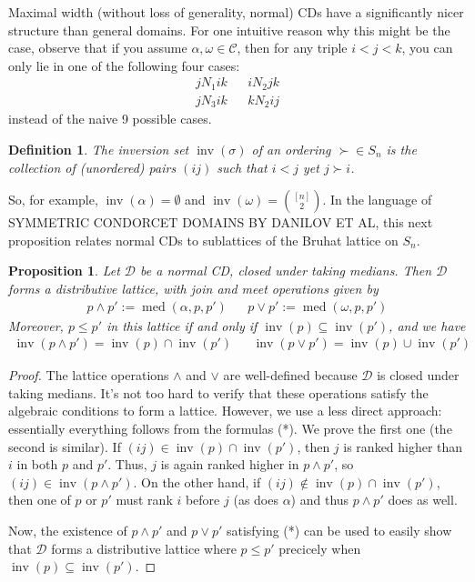 \documentclass[12pt]{article}
\newtheorem{definition}[theorem]{Definition}
\newtheorem{proposition}[theorem]{Proposition}
\newcommand{\C}{\mathcal{C}}
\newcommand{\D}{\mathcal{D}}
\DeclareMathOperator*{\inv}{inv}
\DeclareMathOperator*{\med}{med}
\newcommand{\1}[1]{\mathds{1}[{#1}]}
\begin{document}
  Maximal width (without loss of generality, normal) CDs have a significantly
  nicer structure than general domains. For one intuitive reason why this might
  be the case, observe that if you assume $\alpha,\omega\in\C$, then
  for any triple $i<j<k$, you can only lie in one of the following four cases:
  \begin{align*}
    j N_1 ik && i N_2 jk \\
    j N_3 ik && k N_2 ij
  \end{align*}
  instead of the naive 9 possible cases.

  \begin{definition}
    The inversion set $\inv(\sigma)$ of an ordering $\succ\in S_n$ is
    the collection of (unordered) pairs $(ij)$ such that $i<j$ yet
    $j \succ i$.
  \end{definition}

  So, for example, $\inv(\alpha)=\emptyset$ and $\inv(\omega)={[n]\choose 2}$.
  In the language of SYMMETRIC CONDORCET DOMAINS BY DANILOV ET AL,
  this next proposition relates normal CDs to sublattices of the Bruhat lattice
  on $S_n$.

  \begin{proposition}
    Let $\D$ be a normal CD, closed under taking medians.
    Then $\D$ forms a distributive lattice, with join and meet operations given
    by
    \begin{align*}
      p \wedge p' := \med(\alpha,p,p') &&
      p \vee p' := \med(\omega,p,p')
    \end{align*}
    Moreover, $p \le p'$ in this lattice if and only if 
    $\inv(p)\subseteq\inv(p')$, and we have
    \begin{align*}
      \inv(p \wedge p') = \inv(p)\cap \inv(p') &&
      \inv(p \vee p') = \inv(p)\cup \inv(p')
      \tag{*}
    \end{align*}

  \end{proposition}
  \begin{proof}
    The lattice operations $\wedge$ and $\vee$ are well-defined because $\D$ is
    closed under taking medians. It's not too hard to verify that these
    operations satisfy the algebraic conditions to form a lattice.
    However, we use a less direct approach:
    essentially everything follows from the formulas (*).
    We prove the first one (the second is similar).
    If $(ij) \in\inv(p)\cap\inv(p')$, then $j$ is ranked higher than $i$ in both
    $p$ and $p'$. Thus, $j$ is again ranked higher in $p\wedge p'$, so
    $(ij)\in \inv(p\wedge p')$. On the other hand, if
    $(ij)\notin\inv(p)\cap\inv(p')$, then one of $p$ or $p'$ must rank $i$
    before $j$ (as does $\alpha$) and thus $p\wedge p'$ does as well.

    Now, the existence of $p\wedge p'$ and $p\vee p'$ satisfying (*)
    can be used to easily show that $\D$ forms a distributive lattice where
    $p\le p'$ precicely when $\inv(p)\subseteq\inv(p')$.
  \end{proof}
\end{document}
